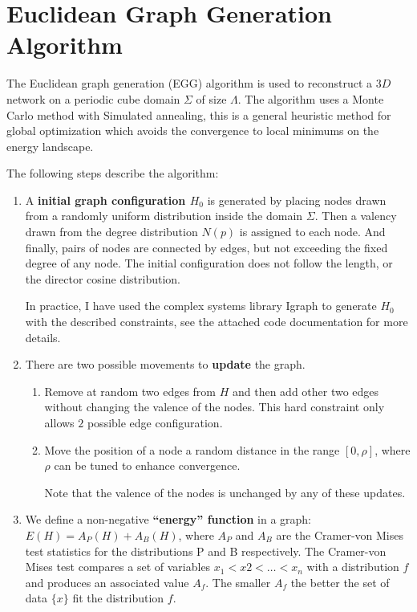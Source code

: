 \section{Euclidean Graph Generation Algorithm}
The Euclidean graph generation (EGG) algorithm is used to reconstruct a $3D$
network on a periodic cube domain $\Sigma$ of size $\Lambda$. The algorithm uses
a Monte Carlo method with Simulated annealing, this is a general heuristic
method for global optimization which avoids the convergence to local minimums on
the energy landscape.

The following steps describe the algorithm:
\begin{enumerate}[label=\textbf{\Roman*}]
  \item A \textbf{initial graph configuration $H_0$} is generated by placing
  nodes drawn from a randomly uniform distribution inside the domain $\Sigma$. Then a
  valency drawn from the degree distribution $N(p)$ is assigned to each node.
  And finally, pairs of nodes are connected by edges, but not exceeding the
  fixed degree of any node. The initial configuration does not follow
  the length, or the director cosine distribution.
  
  In practice, I have used the complex systems library Igraph to generate $H_0$
  with the described constraints, see the attached code documentation for more
  details.
  \item There are two possible movements to \textbf{update} the graph.
    \begin{enumerate}[label=\textbf{\alph*)}]
    \item Remove at random two edges from $H$ and then add other two edges
    without changing the valence of the nodes. This hard constraint only allows
    $2$ possible edge configuration.
    \item Move the position of a node a random distance in the range $[0,\rho]$,
    where $\rho$ can be tuned to enhance convergence.
    
    Note that the valence of the nodes is unchanged by any of these updates.
  \end{enumerate} 
  
  \item We define a non-negative \textbf{``energy'' function} in a graph:
  $E(H)=A_P(H) + A_B(H)$, where $A_P$ and $A_B$ are the Cramer-von Mises test
  statistics for the distributions P and B respectively. The Cramer-von Mises
  test \citep{anderson_distribution_1962} compares a set of variables $x_1<x2<\ldots<x_n$ with a
  distribution $f$ and produces an associated value $A_f$. The smaller $A_f$ the better the set
  of data $\{x\}$ fit the distribution $f$.
  

\end{enumerate}
